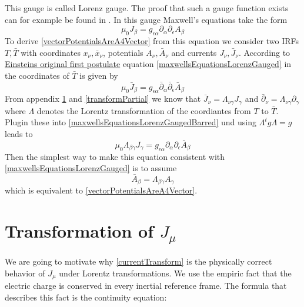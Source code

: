 \documentclass{article}
\begin{document}
This gauge is called Lorenz gauge.
The proof that such a gauge function exists can for example be found in \cite{JacksonLorentzGauge}.
In this gauge Maxwell's equations take the form
\begin{equation} \label{maxwellsEquationsLorenzGauged}
  \mu_0 J_\beta = g_{\epsilon\alpha} \partial_\alpha \partial_\epsilon A_\beta
\end{equation}
To derive \ref{vectorPotentialsAreA4Vector} from this equation we consider two IRFs $T, \bar{T}$ with coordinates $x_\nu, \bar{x}_\nu$, potentials $A_\nu, \bar{A}_\nu$ and currents $J_\nu, \bar{J}_\nu$.
According to \hyperlink{einsteinsOriginalFirstPostulate}{Einsteins original first postulate} equation \ref{maxwellsEquationsLorenzGauged} in the coordinates of $\bar{T}$ is given by
\begin{equation} \label{maxwellsEquationsLorenzGaugedBarred}
  \mu_0 \bar{J}_\beta = g_{\epsilon\alpha} \bar{\partial}_\alpha \bar{\partial}_\epsilon \bar{A}_\beta
\end{equation}
From appendix \ref{appendixConinuity} and \ref{transformPartial} we know that $\bar{J}_\nu = \Lambda_{\nu\gamma} J_\gamma$ and $\bar{\partial}_\nu = \Lambda_{\nu\gamma} \partial_\gamma$ where $\Lambda$ denotes the Lorentz transformation of the coordiantes from $T$ to $\bar{T}$.
Plugin these into \ref{maxwellsEquationsLorenzGaugedBarred} und using $\Lambda^t g \Lambda = g$ leads to
\begin{equation}
  \mu_0 \Lambda_{\beta\gamma}J_\gamma = g_{\epsilon\alpha} \partial_\alpha \partial_\epsilon \bar{A}_\beta
\end{equation}
Then the simplest way to make this equation consistent with \ref{maxwellsEquationsLorenzGauged} is to assume
\begin{equation}
  \bar{A}_\beta = \Lambda_{\beta\gamma} A_\gamma
\end{equation}
which is equivalent to \ref{vectorPotentialsAreA4Vector}.


\appendix

\section{Transformation of $J_\mu$} \label{appendixConinuity}


We are going to motivate why \ref{currentTransform} is the physically correct behavior of $J_\mu$ under Lorentz transformations.
We use the empiric fact that the electric charge is conserved in every inertial reference frame.
The formula that describes this fact is the continuity equation:
\end{document}
